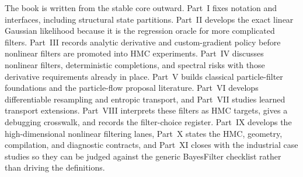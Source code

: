 The book is written from the stable core outward.  Part~I fixes notation and
interfaces, including structural state partitions.  Part~II develops the exact
linear Gaussian likelihood because it is the regression oracle for more
complicated filters.  Part~III records analytic derivative and custom-gradient
policy before nonlinear filters are promoted into HMC experiments.  Part~IV
discusses nonlinear filters, deterministic completions, and spectral risks with
those derivative requirements already in place.  Part~V builds classical
particle-filter foundations and the particle-flow proposal literature.
Part~VI develops differentiable resampling and entropic transport, and
Part~VII studies learned transport extensions.  Part~VIII interprets these
filters as HMC targets, gives a debugging crosswalk, and records the
filter-choice register.  Part~IX develops the high-dimensional nonlinear
filtering lanes, Part~X states the HMC, geometry, compilation, and diagnostic
contracts, and Part~XI closes with the industrial case studies so they can be
judged against the generic BayesFilter checklist rather than driving the
definitions.
